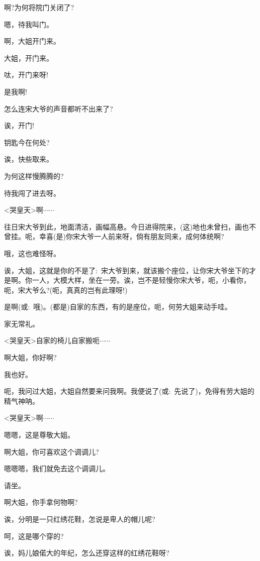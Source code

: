 {

{啊?为何将院门关闭了?}

{嗯，待我叫门。}

{啊，大姐开门来。}

{大姐，开门来。}

{呔，开门来呀!}

{是我啊!}\hspace{10pt}~

{怎么连宋大爷的声音都听不出来了?}

{诶，开门!}

{钥匙今在何处?}

{诶，快些取来。}

{为何这样慢腾腾的?}

{待我闯了进去呀。}

{\textless{}哭皇天\textgreater{}啊$\cdots{}\cdots{}$}

{往日宋大爷到此，地面清洁，画幅高悬。今日进得院来，(这)地也未曾扫，画也不曾挂。呃，幸喜(是)你宋大爷一人前来呀，倘有朋友同来，成何体统啊?}

{哦，这也难怪呀。}

{诶，大姐，这就是你的不是了:~宋大爷到来，就该搬个座位，让你宋大爷坐下的才是啊。你一人，大模大样，坐在一旁。诶，岂不是轻慢你宋大爷，呃，小看你，呃，宋大爷么?(呃，真真的岂有此理呀!)}

{是啊(或:~哦)。(都是)自家的东西，有的是座位，呃，何劳大姐来动手哇。}

{家无常礼。}

{\textless{}哭皇天\textgreater{}自家的椅儿自家搬呃$\cdots{}\cdots{}$}

{啊大姐，你好啊?}

{我也好。}\hspace{10pt}~

{呃，我问过大姐，大姐自然要来问我啊。我便说了(或:~先说了)，免得有劳大姐的精气神呐。}

{\textless{}哭皇天\textgreater{}啊$\cdots{}\cdots{}$}

{嗯嗯，这是尊敬大姐。}

{啊}大姐，你可喜欢这个调调儿?

{嗯嗯嗯，我们就免去这个调调儿。}

{请坐。}

{啊大姐，你手拿何物啊?}

{诶，分明是一只红绣花鞋，怎说是卑人的帽儿呢?}

{呵，这是哪个穿的?}

{诶，妈儿娘偌大的年纪，怎么还穿这样的红绣花鞋呀?}

}
